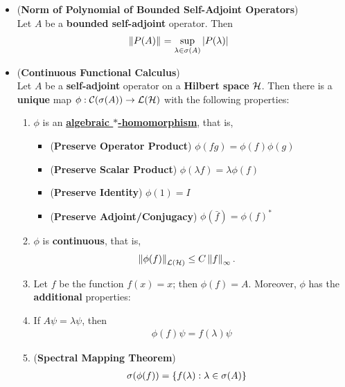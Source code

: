 \documentclass[11pt]{article}
\begin{document}
\begin{itemize}
\item \begin{lemma}  (\textbf{Norm of Polynomial of Bounded Self-Adjoint Operators}) \citep{reed1980methods}\\
Let $A$ be a \textbf{bounded self-adjoint} operator. Then 
\begin{align*}
\left\|P(A)\right\|_{} &= \sup_{\lambda\in \sigma(A)} \left\lvert P(\lambda) \right\rvert
\end{align*}
\end{lemma}

\item \begin{theorem} (\textbf{Continuous Functional Calculus}) \citep{reed1980methods}\\
Let $A$ be a \textbf{self-adjoint}  operator on a \textbf{Hilbert space} ${\mathcal H}$. Then there is a \textbf{unique} map $\phi: {\mathcal C}(\sigma(A)) \to {\mathcal L}({\mathcal H})$ with the following properties: 
\begin{enumerate}
\item $\phi$ is an \underline{\textbf{algebraic $*$-homomorphism}}, that is, 
\begin{itemize}
\item (\textbf{Preserve Operator Product}) $\phi(fg) = \phi(f)\phi(g)$
\item (\textbf{Preserve Scalar Product}) $\phi(\lambda f) = \lambda \phi(f)$
\item (\textbf{Preserve Identity}) $\phi(1) = I$
\item (\textbf{Preserve Adjoint/Conjugacy}) $\phi(\bar{f}) =  \phi(f)^{*}$
\end{itemize}
\item $\phi$ is \textbf{continuous}, that is, 
\begin{align*}
\left\|\phi(f)\right\|_{{\mathcal L}({\mathcal H})} &\le C \left\|f\right\|_{\infty}.
\end{align*}
\item Let $f$ be the function $f(x) = x$; then $\phi(f) = A$. 
Moreover,  $\phi$ has the \textbf{additional} properties: 
\item  If $A\psi = \lambda \psi$, then 
\begin{align}
\phi(f)\psi  = f(\lambda) \psi  \label{eqn: cont_functional_calculas_spectral_decomp}
\end{align}
\item (\textbf{Spectral Mapping Theorem}) 
\begin{align}
\sigma(\phi(f)) &= \left\{f(\lambda): \lambda \in \sigma(A)\right\} \label{eqn: cont_functional_calculas_spectrum_mapping}
\end{align}

\end{enumerate}
\end{theorem}
\end{itemize}
\end{document}
